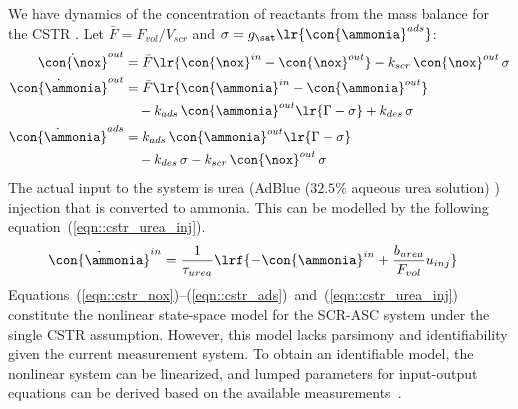 We have dynamics of the concentration of reactants from the mass balance for the CSTR \cite{hsieh2011development}. Let
$\bar F = F_{vol}/V_{scr}$ and $\sigma = g_{\sat}\lr{\con{\ammonia}^{ads}}$:
\begin{align}
    \dot{\con{\nox}}^{out} &= \bar F \lr{\con{\nox}^{in} - \con{\nox}^{out}}
        - k_{scr}\, \con{\nox}^{out}\, \sigma
    \label{eqn::cstr_nox}\\
    \dot{\con{\ammonia}}^{out} &= \bar F \lr{\con{\ammonia}^{in} - \con{\ammonia}^{out}} \notag\\
        &\quad - k_{ads}\, \con{\ammonia}^{out} \lr{\Gamma - \sigma}
        + k_{des}\, \sigma
    \label{eqn::cstr_nh3}\\
    \dot{\con{\ammonia}}^{ads} &= k_{ads}\, \con{\ammonia}^{out} \lr{\Gamma - \sigma} \notag\\
        &\quad - k_{des}\, \sigma
        - k_{scr}\, \con{\nox}^{out}\, \sigma
    \label{eqn::cstr_ads}
\end{align}
The actual input to the system is urea (AdBlue ($32.5\%$ aqueous urea solution) \cite{nova2014urea})
injection that is converted to ammonia. This can be modelled by the following equation~(\ref{eqn::cstr_urea_inj}).
\begin{align}
    \dot{\con{\ammonia}}^{in} & = \frac{1}{\tau_{urea}} \lrf{ - \con{\ammonia}^{in} +   \frac{b_{urea}}{F_{vol}}  u_{inj}}
    \label{eqn::cstr_urea_inj}
\end{align}
Equations~(\ref{eqn::cstr_nox})--(\ref{eqn::cstr_ads})~and~(\ref{eqn::cstr_urea_inj}) constitute the nonlinear state-space model for the
SCR-ASC system under the single CSTR assumption. However, this model lacks parsimony and identifiability given the
current measurement system. To obtain an identifiable model, the nonlinear system can be linearized, and lumped
parameters for input-output equations can be derived based on the available measurements~\cite{charla2024reduced}.

